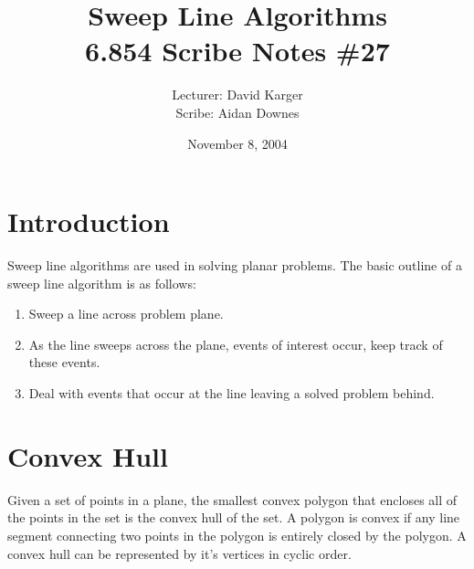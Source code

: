 \documentclass{article}
\title{Sweep Line Algorithms\\6.854 Scribe Notes \#27}
\date{November 8, 2004}
\author{Lecturer: David Karger\\ Scribe: Aidan Downes}
\begin{document}
%
%
%
%

%



\section{Introduction}

Sweep line algorithms are used in solving planar problems. The basic outline of a sweep line algorithm is as follows:
\begin{enumerate}
\item Sweep a line across problem plane. 
\item As the line sweeps across the plane, events of interest occur, keep track of these events.
\item Deal with events that occur at the line leaving a solved problem behind.
\end{enumerate}


\section{Convex Hull}

Given a set of points in a plane, the smallest convex polygon that encloses all of the points in the set is the convex hull of the set. A polygon is convex if any line segment connecting two points in the polygon is entirely closed by the polygon. A convex hull can be represented by it's vertices in cyclic order.
\end{document}
